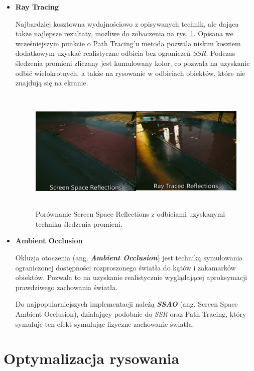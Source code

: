 \begin{itemize}
	\item \textbf{Ray Tracing}

	Najbardziej kosztowna wydajnościowo z opisywanych technik, ale dająca także najlepsze rezultaty, możliwe do zobaczenia na rys. \ref{intro-rt}. Opisana we wcześniejszym punkcie o Path Tracing'u metoda pozwala niskim kosztem dodatkowym uzyskać realistyczne odbicia bez ograniczeń \emph{SSR}. Podczas śledzenia promieni zliczany jest kumulowany kolor, co pozwala na uzyskanie odbić wielokrotnych, a także na rysowanie w odbiciach obiektów, które nie znajdują się na ekranie.

	\begin{figure}[htbp]
		\centering
		\includegraphics[width=5.82534in,height=2.32148in]{images/12_ssr_vs_rt.png}
		\caption{Porównanie Screen Space Reflections z odbiciami uzyskanymi techniką śledzenia promieni. \cite{niktek:reflections:2024}}
		\label{intro-rt}
	\end{figure}
	
	\vfill
	\clearpage
	
	\item \textbf{Ambient Occlusion}
	
	Okluzja otoczenia (ang. \emph{\textbf{Ambient Occlusion}}) jest techniką symulowania ograniczonej dostępności rozproszonego światła do kątów i zakamarków obiektów. Pozwala to na uzyskanie realistycznie wyglądającej aproksymacji prawdziwego zachowania światła.

	Do najpopularniejszych implementacji należą \emph{\textbf{SSAO}} (ang. Screen Space Ambient Occlusion), działający podobnie do \emph{SSR} oraz Path Tracing, który symuluje ten efekt symulując fizyczne zachowanie światła.
\end{itemize}

\section{Optymalizacja rysowania}

